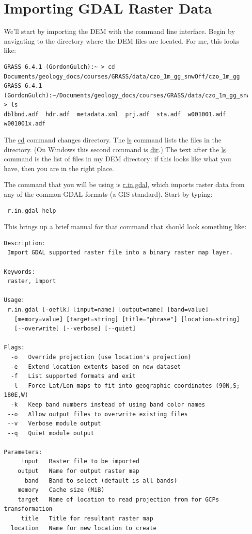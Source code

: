 \documentclass{book}
\begin{document}
\section{Importing GDAL Raster Data \label{s:importgdal}}

We'll start by importing the DEM with the command line interface. Begin by navigating to the directory where the DEM files are located. For me, this looks like:
\begin{lstlisting}
GRASS 6.4.1 (GordonGulch):~ > cd Documents/geology_docs/courses/GRASS/data/czo_1m_gg_snwOff/czo_1m_gg
GRASS 6.4.1 (GordonGulch):~/Documents/geology_docs/courses/GRASS/data/czo_1m_gg_snwOff/czo_1m_gg > ls
dblbnd.adf  hdr.adf  metadata.xml  prj.adf  sta.adf  w001001.adf  w001001x.adf
\end{lstlisting}
The \url{cd} command changes directory. The \url{ls} command lists the files in the directory. (On Windows this second command is \url{dir}.) The text after the \url{ls} command is the list of files in my DEM directory: if this looks like what you have, then you are in the right place.

The command that you will be using is \url{r.in.gdal}, which imports raster data from any of the common GDAL formats (a GIS standard). Start by typing:
\begin{lstlisting}
 r.in.gdal help
\end{lstlisting}
This brings up a brief manual for that command that should look something like:
\begin{lstlisting}
Description:
 Import GDAL supported raster file into a binary raster map layer.

Keywords:
 raster, import

Usage:
 r.in.gdal [-oeflk] [input=name] [output=name] [band=value]
   [memory=value] [target=string] [title="phrase"] [location=string]
   [--overwrite] [--verbose] [--quiet]

Flags:
  -o   Override projection (use location's projection)
  -e   Extend location extents based on new dataset
  -f   List supported formats and exit
  -l   Force Lat/Lon maps to fit into geographic coordinates (90N,S; 180E,W)
  -k   Keep band numbers instead of using band color names
 --o   Allow output files to overwrite existing files
 --v   Verbose module output
 --q   Quiet module output

Parameters:
     input   Raster file to be imported
    output   Name for output raster map
      band   Band to select (default is all bands)
    memory   Cache size (MiB)
    target   Name of location to read projection from for GCPs transformation
     title   Title for resultant raster map
  location   Name for new location to create
\end{lstlisting}
\end{document}
